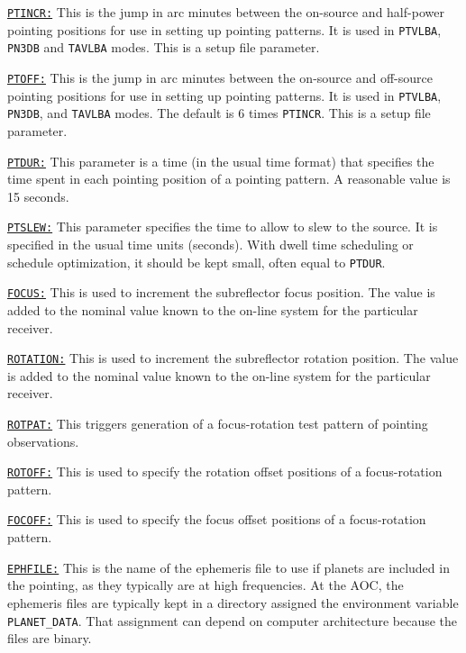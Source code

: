 \documentclass{report}
\begin{document}
\begin{list}{}{\parsep 0em  \itemsep 0em }
\item 
{\hyperref[SP:PTINCR]{{\tt PTINCR:}}} This is the jump in arc minutes
between the on-source and half-power pointing positions for use in
setting up pointing patterns.  It is used in {\tt PTVLBA}, {\tt PN3DB} and
{\tt TAVLBA} modes.  This is a setup file parameter.

\item 
{\hyperref[SP:PTOFF]{{\tt PTOFF:}}} This is the jump in arc minutes
between the on-source and off-source pointing positions for use in
setting up pointing patterns.  It is used in {\tt PTVLBA}, {\tt PN3DB},
and {\tt TAVLBA} modes.  The default is 6 times {\tt PTINCR}.
This is a setup file parameter.

\item 
{\hyperref[MP:PTDUR]{{\tt PTDUR:}}}  This parameter is a time (in
the usual time format) that specifies the time spent in each pointing
position of a pointing pattern.  A reasonable value is 15 seconds.

\item 
{\hyperref[MP:PTSLEW]{{\tt PTSLEW:}}}  This parameter specifies the
time to allow to slew to the source.  It is specified in the usual time
units (seconds).  With dwell time scheduling or schedule optimization,
it should be kept small, often equal to {\tt PTDUR}.

\item 
{\hyperref[MP:FOCUS]{{\tt FOCUS:}}}  This is used to increment the
subreflector focus position.  The value is added to the nominal value
known to the on-line system for the particular receiver.

\item 
{\hyperref[MP:ROTATION]{{\tt ROTATION:}}} This is used to increment
the subreflector rotation position.  The value is added to the nominal
value known to the on-line system for the particular receiver.

\item 
{\hyperref[MP:ROTPAT]{{\tt ROTPAT:}}}  This triggers generation
of a focus-rotation test pattern of pointing observations.

\item 
{\hyperref[MP:ROTOFF]{{\tt ROTOFF:}}}  This is used to specify
the rotation offset positions of a focus-rotation pattern.

\item 
{\hyperref[MP:FOCOFF]{{\tt FOCOFF:}}}  This is used to specify
the focus offset positions of a focus-rotation pattern.

\item 
{\hyperref[MP:EPHFILE]{{\tt EPHFILE:}}} This is the name of
the ephemeris file to use if planets are included in the pointing,
as they typically are at high frequencies.  At the AOC, the
ephemeris files are typically kept in a directory assigned the
environment variable {\tt PLANET\_DATA}.  That assignment can
depend on computer architecture because the files are binary.

\end{list}
\end{document}
